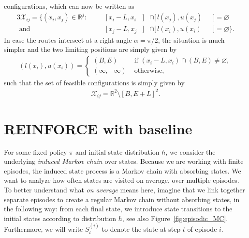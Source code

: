 \documentclass[a4paper]{report}
\theoremstyle{definition}
\theoremstyle{plain}
\begin{document}
configurations, which can now be written as
\begin{alignat}{3}
  \mathcal{X}_{ij} = \{ (x_{i}, x_{j}) \in \mathbb{R}^{j} :& \; &&[\,x_{i} - L,x_{i} &]& \cap [\,l(x_{j}), u(x_{j}) &&] = \varnothing \\
  \text{ and } & \, &&[\,x_{j} - L, x_{j} &]& \cap [\,l(x_{i}), u(x_{i}) &&] = \varnothing \} .
\end{alignat}
%
In case the routes intersect at a right angle $\alpha = \pi / 2$, the situation
is much simpler and the two limiting positions are simply given by
\begin{align}
  (l(x_{i}), u(x_{i})) =
  \begin{cases}
    (B,  E)    &\text{ if } (x_{i} - L, x_{i}) \cap (B, E) \neq \varnothing , \\
    (\infty, -\infty) &\text{ otherwise, }
  \end{cases}
\end{align}
such that the set of feasible configurations is simply given by
\begin{align}
  \mathcal{X}_{ij} = \mathbb{R}^{2} \setminus [B,E + L]^{2} .
\end{align}

\chapter{REINFORCE with baseline}

For some fixed policy $\pi$ and initial state distribution $h$, we consider the
underlying \textit{induced Markov chain} over states. Because we are working with finite
episodes, the induced state process is a Markov chain with absorbing states.
%
We want to analyze how often states are visited on average, over multiple episodes.
%
To better understand what \textit{on average} means here, imagine that we link
together separate episodes to create a regular Markov chain without absorbing
states, in the following way: from each final state, we introduce state
transitions to the initial states according to distribution $h$, see also
Figure~\ref{fig:episodic_MC}. Furthermore, we will write $S_{t}^{(i)}$ to denote
the state at step $t$ of episode $i$.
\end{document}

